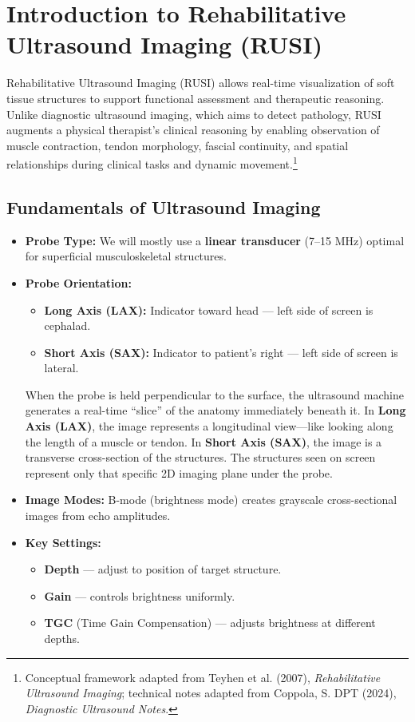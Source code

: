 \section*{Introduction to Rehabilitative Ultrasound Imaging (RUSI)}

Rehabilitative Ultrasound Imaging (RUSI) allows real-time visualization of soft tissue structures to support functional assessment and therapeutic reasoning. Unlike diagnostic ultrasound imaging, which aims to detect pathology, RUSI augments a physical therapist’s clinical reasoning by enabling observation of muscle contraction, tendon morphology, fascial continuity, and spatial relationships during clinical tasks and dynamic movement.\footnote{Conceptual framework adapted from Teyhen et al. (2007), \textit{Rehabilitative Ultrasound Imaging}; technical notes adapted from Coppola, S. DPT (2024), \textit{Diagnostic Ultrasound Notes}.}

\subsection*{Fundamentals of Ultrasound Imaging}

\begin{itemize}
  \item \textbf{Probe Type:} We will mostly use a \textbf{linear transducer} (7–15 MHz) optimal for superficial musculoskeletal structures.

  \item \textbf{Probe Orientation:} 
  \begin{itemize}
    \item \textbf{Long Axis (LAX):} Indicator toward head — left side of screen is cephalad.
    \item \textbf{Short Axis (SAX):} Indicator to patient’s right — left side of screen is lateral.
  \end{itemize}

  When the probe is held perpendicular to the surface, the ultrasound machine generates a real-time “slice” of the anatomy immediately beneath it. In \textbf{Long Axis (LAX)}, the image represents a longitudinal view—like looking along the length of a muscle or tendon. In \textbf{Short Axis (SAX)}, the image is a transverse cross-section of the structures. The structures seen on screen represent only that specific 2D imaging plane under the probe.

  \item \textbf{Image Modes:} B-mode (brightness mode) creates grayscale cross-sectional images from echo amplitudes.

  \item \textbf{Key Settings:} 
  \begin{itemize}
    \item \textbf{Depth} — adjust to position of target structure.
    \item \textbf{Gain} — controls brightness uniformly.
    \item \textbf{TGC} (Time Gain Compensation) — adjusts brightness at different depths.
  \end{itemize}
\end{itemize}

